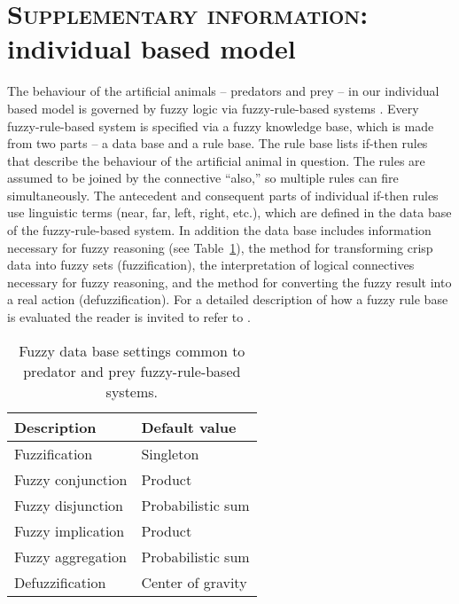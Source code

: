 








\section{\textsc{Supplementary information:} \textnormal{individual based model}}

The behaviour of the artificial animals -- predators and prey -- in our individual based model is governed by fuzzy logic \cite{zadeh1965fuzzy} via fuzzy-rule-based systems \cite{mamdani1974application}. Every fuzzy-rule-based system is specified via a fuzzy knowledge base, which is made from two parts -- a data base and a rule base. The rule base lists if-then rules that describe the behaviour of the artificial animal in question. The rules are assumed to be joined by the connective ``also,'' so multiple rules can fire simultaneously. The antecedent and consequent parts of individual if-then rules use linguistic terms (near, far, left, right, etc.), which are defined in the data base of the fuzzy-rule-based system. In addition the data base includes information necessary for fuzzy reasoning (see Table~\ref{table:fuzzy}), \ie the method for transforming crisp data into fuzzy sets (fuzzification), the interpretation of logical connectives necessary for fuzzy reasoning, and the method for converting the fuzzy result into a real action (defuzzification). For a detailed description of how a fuzzy rule base is evaluated the reader is invited to refer to \cite{lebarbajec2005fuzzy,lebarbajec2005simulating,mendel2001uncertain}.

\begin{table}
  \caption{Fuzzy data base settings common to predator and prey fuzzy-rule-based systems.}
  \label{table:fuzzy}
  \begin{tabular}{l l}
    \toprule
    Description & Default value \\ [0.5ex]
    \midrule
    Fuzzification & Singleton \\
    Fuzzy conjunction & Product \\
    Fuzzy disjunction & Probabilistic sum \\
    Fuzzy implication & Product \\
    Fuzzy aggregation & Probabilistic sum \\
    Defuzzification & Center of gravity \\
    \bottomrule
  \end{tabular}
\end{table}

